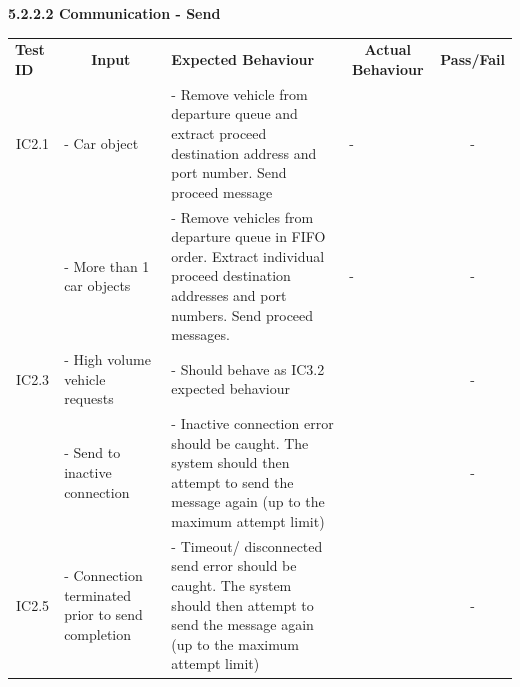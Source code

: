 \documentclass [10pt]{article}
\begin{document}
    \textbf{5.2.2.2 Communication - Send} \vspace{2mm}
 \begin{longtable}{ |p{ }  |   p{ } | p{ } | p{ } |  p{ } |}  \hline

    \rowcolor{subsectionC}\textbf{Test ID}
    & \multicolumn{1}{c|}{\textbf{Input} }
    & \textbf{Expected Behaviour} 
    & \multicolumn{1}{c|}{\textbf{Actual Behaviour} }
    & \multicolumn{1}{c|}{\textbf{Pass/Fail}} \\  
    
   
    \multicolumn{1}{|c|}{IC2.1} 
    & - Car object  
    & - Remove vehicle from departure queue and extract proceed destination address and port number. Send proceed message 
    & - 
    & \multicolumn{1}{c|}{-}\\ 
    
  
    \rowcolor{tableCell}\multicolumn{1}{|c|}{IC2.2} 
    & - More than 1 car objects 
    & - Remove vehicles from departure queue in FIFO order. Extract individual proceed destination addresses and port numbers. Send proceed messages. 
    & -
    & \multicolumn{1}{c|}{-}\\ 
    
    
    \multicolumn{1}{|c|}{IC2.3} 
    & - High volume vehicle requests
    & - Should behave as IC3.2 expected behaviour
    &  
    & \multicolumn{1}{c|}{-}\\
   
    \rowcolor{tableCell}\multicolumn{1}{|c|}{IC2.4} 
    & - Send to inactive connection
    & - Inactive connection error should be caught. The system should then attempt to send the message again (up to the maximum attempt limit)
    & 
    & \multicolumn{1}{c|}{-}\\ 
    
    \multicolumn{1}{|c|}{IC2.5} 
    & - Connection terminated prior to send completion 
    & - Timeout/ disconnected send error should be caught.  The system should then attempt to send the message again (up to the maximum attempt limit)
    & 
    & \multicolumn{1}{c|}{-}\\ \hline

     
    \end{longtable}
    
\end{document}

